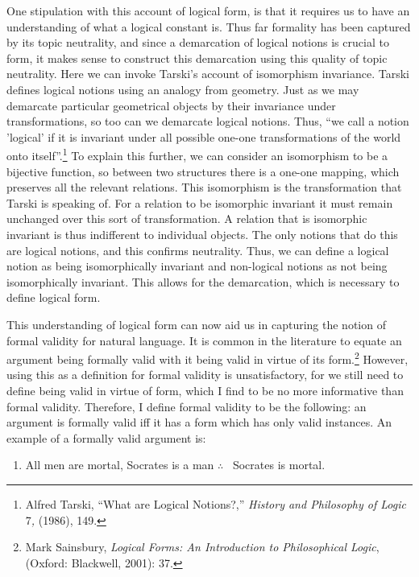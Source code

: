 One stipulation with this account of logical form, is that it requires
us to have an understanding of what a logical constant is. Thus far
formality has been captured by its topic neutrality, and since a
demarcation of logical notions is crucial to form, it makes sense to
construct this demarcation using this quality of topic neutrality. Here
we can invoke Tarski's account of isomorphism invariance. Tarski defines
logical notions using an analogy from geometry. Just as we may demarcate
particular geometrical objects by their invariance under
transformations, so too can we demarcate logical notions. Thus, ``we
call a notion 'logical' if it is invariant under all possible one-one
transformations of the world onto itself''.\footnote{Alfred Tarski,
  ``What are Logical Notions?,'' \emph{History and Philosophy of Logic}
  7\emph{,} (1986), 149.} To explain this further, we can consider an
isomorphism to be a bijective function, so between two structures there
is a one-one mapping, which preserves all the relevant relations. This
isomorphism is the transformation that Tarski is speaking of. For a
relation to be isomorphic invariant it must remain unchanged over this
sort of transformation. A relation that is isomorphic invariant is thus
indifferent to individual objects. The only notions that do this are
logical notions, and this confirms neutrality. Thus, we can define a
logical notion as being isomorphically invariant and non-logical notions
as not being isomorphically invariant. This allows for the demarcation,
which is necessary to define logical form.

This understanding of logical form can now aid us in capturing the
notion of formal validity for natural language. It is common in the
literature to equate an argument being formally valid with it being
valid in virtue of its form.\footnote{Mark Sainsbury, \emph{Logical
  Forms: An Introduction to Philosophical Logic}, (Oxford: Blackwell,
  2001): 37.} However, using this as a definition for formal validity is
unsatisfactory, for we still need to define being valid in virtue of
form, which I find to be no more informative than formal validity.
Therefore, I define formal validity to be the following: an argument is
formally valid iff it has a form which has only valid instances. An
example of a formally valid argument is:

\begin{enumerate}[leftmargin=42] 
\def\labelenumi{(\arabic{enumi})}
\setcounter{enumi}{2}
\item
  All men are mortal, Socrates is a man $\therefore$ \ Socrates is mortal.
\end{enumerate} 

